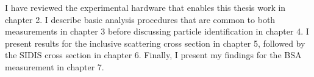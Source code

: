 I have reviewed the experimental hardware that enables this thesis work in chapter 2.  I describe basic analysis procedures that are common to both measurements in chapter 3 before discussing particle identification in chapter 4.  I present results for the inclusive scattering cross section in chapter 5, followed by the SIDIS cross section in chapter 6.  Finally, I present my findings for the BSA measurement in chapter 7.
